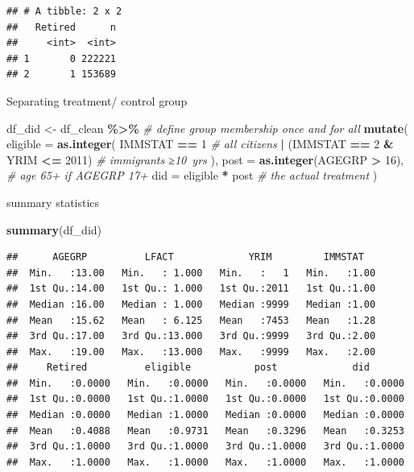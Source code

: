 \documentclass[
]{article}
\newenvironment{Shaded}{\begin{snugshade}}{\end{snugshade}}
\newcommand{\AttributeTok}[1]{\textcolor[rgb]{0.13,0.29,0.53}{#1}}
\newcommand{\CommentTok}[1]{\textcolor[rgb]{0.56,0.35,0.01}{\textit{#1}}}
\newcommand{\DecValTok}[1]{\textcolor[rgb]{0.00,0.00,0.81}{#1}}
\newcommand{\FunctionTok}[1]{\textcolor[rgb]{0.13,0.29,0.53}{\textbf{#1}}}
\newcommand{\NormalTok}[1]{#1}
\newcommand{\OtherTok}[1]{\textcolor[rgb]{0.56,0.35,0.01}{#1}}
\newcommand{\SpecialCharTok}[1]{\textcolor[rgb]{0.81,0.36,0.00}{\textbf{#1}}}
\begin{document}
\begin{verbatim}
## # A tibble: 2 x 2
##   Retired      n
##     <int>  <int>
## 1       0 222221
## 2       1 153689
\end{verbatim}

Separating treatment/ control group

\begin{Shaded}
\begin{Highlighting}[]
\NormalTok{df\_did }\OtherTok{\textless{}{-}}\NormalTok{ df\_clean }\SpecialCharTok{\%\textgreater{}\%}
  \CommentTok{\# define group membership once and for all}
  \FunctionTok{mutate}\NormalTok{(}
    \AttributeTok{eligible =} \FunctionTok{as.integer}\NormalTok{(}
\NormalTok{      IMMSTAT }\SpecialCharTok{==} \DecValTok{1}                          \CommentTok{\# all citizens}
      \SpecialCharTok{|}\NormalTok{ (IMMSTAT }\SpecialCharTok{==} \DecValTok{2} \SpecialCharTok{\&}\NormalTok{ YRIM }\SpecialCharTok{\textless{}=} \DecValTok{2011}\NormalTok{)      }\CommentTok{\# immigrants ≥10 yrs}
\NormalTok{    ),}
    \AttributeTok{post =} \FunctionTok{as.integer}\NormalTok{(AGEGRP }\SpecialCharTok{\textgreater{}} \DecValTok{16}\NormalTok{),        }\CommentTok{\# age 65+ if AGEGRP 17+}
    \AttributeTok{did  =}\NormalTok{ eligible }\SpecialCharTok{*}\NormalTok{ post                 }\CommentTok{\# the actual treatment}
\NormalTok{  )}
\end{Highlighting}
\end{Shaded}

summary statistics

\begin{Shaded}
\begin{Highlighting}[]
\FunctionTok{summary}\NormalTok{(df\_did)}
\end{Highlighting}
\end{Shaded}

\begin{verbatim}
##      AGEGRP          LFACT             YRIM         IMMSTAT    
##  Min.   :13.00   Min.   : 1.000   Min.   :   1   Min.   :1.00  
##  1st Qu.:14.00   1st Qu.: 1.000   1st Qu.:2011   1st Qu.:1.00  
##  Median :16.00   Median : 1.000   Median :9999   Median :1.00  
##  Mean   :15.62   Mean   : 6.125   Mean   :7453   Mean   :1.28  
##  3rd Qu.:17.00   3rd Qu.:13.000   3rd Qu.:9999   3rd Qu.:2.00  
##  Max.   :19.00   Max.   :13.000   Max.   :9999   Max.   :2.00  
##     Retired          eligible           post             did        
##  Min.   :0.0000   Min.   :0.0000   Min.   :0.0000   Min.   :0.0000  
##  1st Qu.:0.0000   1st Qu.:1.0000   1st Qu.:0.0000   1st Qu.:0.0000  
##  Median :0.0000   Median :1.0000   Median :0.0000   Median :0.0000  
##  Mean   :0.4088   Mean   :0.9731   Mean   :0.3296   Mean   :0.3253  
##  3rd Qu.:1.0000   3rd Qu.:1.0000   3rd Qu.:1.0000   3rd Qu.:1.0000  
##  Max.   :1.0000   Max.   :1.0000   Max.   :1.0000   Max.   :1.0000
\end{verbatim}
\end{document}
